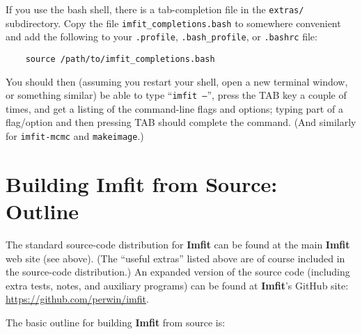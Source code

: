 \documentclass[10pt,a4paper,article]{memoir}
\newcommand{\Imfit}{\textbf{Imfit}}
\newcommand{\imfitmcmc}{\texttt{imfit-mcmc}}
\newcommand{\makeimage}{\texttt{makeimage}}
\begin{document}
If you use the bash shell, there is a tab-completion file in the
\texttt{extras/} subdirectory. Copy the file \texttt{imfit\_completions.bash}
to somewhere convenient and 
add the following to your \texttt{.profile}, \texttt{.bash\_profile}, or 
\texttt{.bashrc} file:

\begin{verbatim}
    source /path/to/imfit_completions.bash
\end{verbatim}

You should then (assuming you restart your shell, open a new terminal
window, or something similar) be able to type ``\texttt{imfit --}'', press the
TAB key a couple of times, and get a listing of the command-line flags
and options; typing part of a flag/option and then pressing TAB should
complete the command. (And similarly for \imfitmcmc{} and \makeimage{}.)



\section{Building \Imfit{} from Source: Outline}

The standard source-code distribution for \Imfit{} can be found at the
main \Imfit{} web site (see above). (The ``useful extras'' listed above
are of course included in the source-code distribution.) An expanded version of
the source code (including extra tests, notes, and auxiliary programs)
can be found at \Imfit's GitHub site:
\url{https://github.com/perwin/imfit}.

The basic outline for building \Imfit{} from source is:
\end{document}
